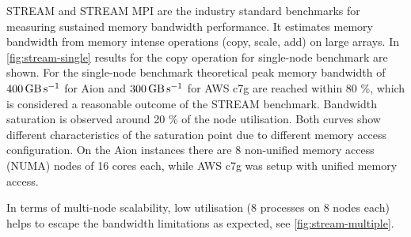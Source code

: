 STREAM and STREAM MPI \cite{McCalpin1995,McCalpin2007} are the industry standard
benchmarks for measuring sustained memory bandwidth performance. It estimates
memory bandwidth from memory intense operations (copy, scale, add) on large
arrays. In \autoref{fig:stream-single} results for the copy operation for
single-node benchmark are shown. For the single-node benchmark theoretical peak
memory bandwidth of $\SI{400}{\giga\byte\per\second}$ for Aion and
$\SI{300}{\giga\byte\per\second}$ for AWS c7g are reached within 80 \%, which is
considered a reasonable outcome of the STREAM benchmark. Bandwidth saturation is
observed around 20 \% of the node utilisation. Both curves show different
characteristics of the saturation point due to different memory access
configuration. On the Aion instances there are 8 non-unified memory access
(NUMA) nodes of 16 cores each, while AWS c7g was setup with unified memory
access.

In terms of multi-node scalability, low utilisation (8 processes on 8 nodes
each) helps to escape the bandwidth limitations as expected, see
\autoref{fig:stream-multiple}.

